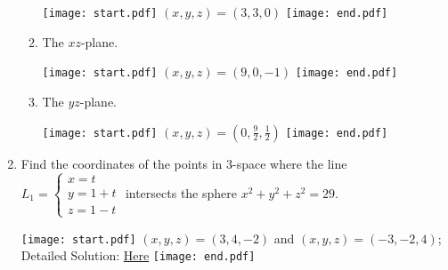 \documentclass[12pt]{article}
\begin{document}
\begin{enumerate}
\begin{enumerate}
\texttt{[image: start.pdf]}
{{$(x,y,z)=(3,3,0)$}}
\texttt{[image: end.pdf]}


\item The $xz$-plane.

\texttt{[image: start.pdf]}
{{$(x,y,z)=(9,0,-1)$}}
\texttt{[image: end.pdf]}


\item The $yz$-plane.

\texttt{[image: start.pdf]}
{{$(x,y,z)=\left(0,\frac{9}{2},\frac{1}{2}\right)$}}
\texttt{[image: end.pdf]}


\end{enumerate}

\item Find the coordinates of the points in 3-space where the line $L_1=\left\{\begin{array}{l}
x=t\\y=1+t\\
z=1-t\end{array}\right.$ intersects the sphere $x^2+y^2+z^2=29$.

\texttt{[image: start.pdf]}
{{$(x,y,z)=(3,4,-2)$ and $(x,y,z)=(-3,-2,4)$; Detailed Solution: \textcolor{blue}{\href{http://www.math.drexel.edu/classes/Calculus/resources/Math200HW/Solutions/05_200_Lines_07.pdf}{Here}}}}
\texttt{[image: end.pdf]}


\end{enumerate}

\end{document}
